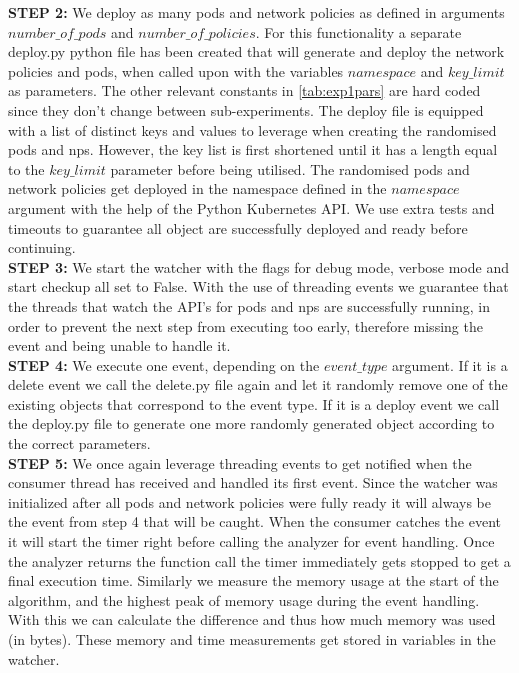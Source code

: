 \textbf{STEP 2:} We deploy as many pods and network policies as defined in arguments \newline $number\_of\_pods$ and $number\_of\_policies$. For this functionality a separate deploy.py python file has been created that will generate and deploy the network policies and pods, when called upon with the variables $namespace$ and $key\_limit$ as parameters. The other relevant constants in \autoref{tab:exp1pars} are hard coded since they don't change between sub-experiments. The deploy file is equipped with a list of distinct keys and values to leverage when creating the randomised pods and \acrshort{np}s. However, the key list is first shortened until it has a length equal to the $key\_limit$ parameter before being utilised. The randomised pods and network policies get deployed in the namespace defined in the $namespace$ argument with the help of the Python Kubernetes API. We use extra tests and timeouts to guarantee all object are successfully deployed and ready before continuing.
\\[10pt]

\textbf{STEP 3:} We start the watcher with the flags for debug mode, verbose mode and start checkup all set to False. With the use of threading events we guarantee that the threads that watch the API's for pods and \acrshort{np}s are successfully running, in order to prevent the next step from executing too early, therefore missing the event and being unable to handle it.
\\[10pt]

\textbf{STEP 4:} We execute one event, depending on the $event\_type$ argument. If it is a delete event we call the delete.py file again and let it randomly remove one of the existing objects that correspond to the event type. If it is a deploy event we call the deploy.py file to generate one more randomly generated object according to the correct parameters.
\\[10pt]

\textbf{STEP 5:} We once again leverage threading events to get notified when the consumer thread has received and handled its first event. Since the watcher was initialized after all pods and network policies were fully ready it will always be the event from step 4 that will be caught. When the consumer catches the event it will start the timer right before calling the analyzer for event handling. Once the analyzer returns the function call the timer immediately gets stopped to get a final execution time. Similarly we measure the memory usage at the start of the algorithm, and the highest peak of memory usage during the event handling. With this we can calculate the difference and thus how much memory was used (in bytes). These memory and time measurements get stored in variables in the watcher.
\\[10pt]

